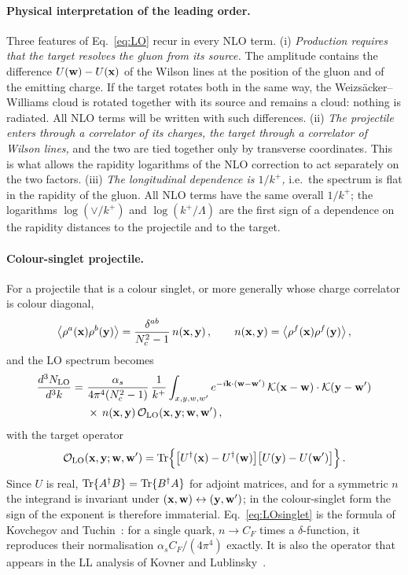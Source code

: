 \paragraph{Physical interpretation of the leading order.} Three features of Eq.~\eqref{eq:LO} recur in every NLO term. (i) \emph{Production requires that the target resolves the gluon from its source.} The amplitude contains the difference $U(\mathbf{w})-U(\mathbf{x})$ of the Wilson lines at the position of the gluon and of the emitting charge. If the target rotates both in the same way, the Weizs\"acker--Williams cloud is rotated together with its source and remains a cloud: nothing is radiated. All NLO terms will be written with such differences. (ii) \emph{The projectile enters through a correlator of its charges, the target through a correlator of Wilson lines,} and the two are tied together only by transverse coordinates. This is what allows the rapidity logarithms of the NLO correction to act separately on the two factors. (iii) \emph{The longitudinal dependence is $1/k^+$,} i.e.\ the spectrum is flat in the rapidity of the gluon. All NLO terms have the same overall $1/k^+$; the logarithms $\log(\vee/k^+)$ and $\log(k^+/\Lambda)$ are the first sign of a dependence on the rapidity distances to the projectile and to the target.

\paragraph{Colour-singlet projectile.} For a projectile that is a colour singlet, or more generally whose charge correlator is colour diagonal,
\begin{align}\label{eq:singlet}
\big\langle\rho^a(\mathbf{x})\rho^b(\mathbf{y})\big\rangle=\frac{\delta^{ab}}{N_c^2-1}\,n(\mathbf{x},\mathbf{y})\,,\qquad n(\mathbf{x},\mathbf{y})=\big\langle\rho^f(\mathbf{x})\rho^f(\mathbf{y})\big\rangle\,,
\end{align}
and the LO spectrum becomes
\begin{align}\label{eq:LOsinglet}
\frac{d^3N_{\rm LO}}{d^3k}=\ &\frac{\alpha_s}{4\pi^4(N_c^2-1)}\,\frac{1}{k^+}\int_{x,y,w,w'}e^{-i\v k\cdot(\v w-\v w')}\,\Kv(\v x-\v w)\cdot\Kv(\v y-\v w')
\notag\\&\times\,n(\v x,\v y)\,
\mathcal O_{\rm LO}(\v x,\v y;\v w,\v w')\,,
\end{align}
with the target operator
\begin{align}\label{eq:OLO}
\mathcal O_{\rm LO}(\mathbf{x},\mathbf{y};\mathbf{w},\mathbf{w}')={\rm Tr}\Big\{\big[U^\dagger(\mathbf{x})-U^\dagger(\mathbf{w})\big]\big[U(\mathbf{y})-U(\mathbf{w}')\big]\Big\}\,.
\end{align}
Since $U$ is real, ${\rm Tr}\{A^\dagger B\}={\rm Tr}\{B^\dagger A\}$ for adjoint matrices, and for a symmetric $n$ the integrand is invariant under $(\mathbf{x},\mathbf{w})\leftrightarrow(\mathbf{y},\mathbf{w}')$; in the colour-singlet form the sign of the exponent is therefore immaterial. Eq.~\eqref{eq:LOsinglet} is the formula of Kovchegov and Tuchin~\cite{Kovchegov:2001sc}: for a single quark, $n\to C_F$ times a $\delta$-function, it reproduces their normalisation $\alpha_sC_F/(4\pi^4)$ exactly. It is also the operator that appears in the LL analysis of Kovner and Lublinsky~\cite{Kovner:2006wr,Kovner:2006ge}.

